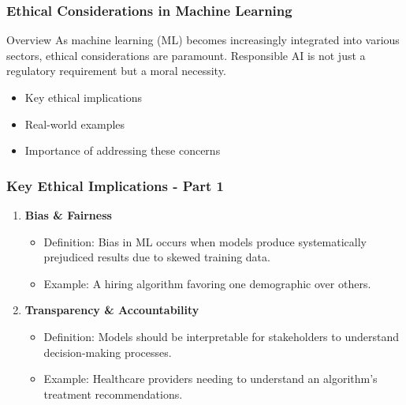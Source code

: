 \documentclass[aspectratio=169]{beamer}
\begin{document}
\begin{frame}[fragile]
    \frametitle{Ethical Considerations in Machine Learning}
    \begin{block}{Overview}
        As machine learning (ML) becomes increasingly integrated into various sectors, ethical considerations are paramount. Responsible AI is not just a regulatory requirement but a moral necessity.
    \end{block}
    \begin{itemize}
        \item Key ethical implications
        \item Real-world examples
        \item Importance of addressing these concerns
    \end{itemize}
\end{frame}

\begin{frame}[fragile]
    \frametitle{Key Ethical Implications - Part 1}
    \begin{enumerate}
        \item \textbf{Bias \& Fairness}
        \begin{itemize}
            \item Definition: Bias in ML occurs when models produce systematically prejudiced results due to skewed training data.
            \item Example: A hiring algorithm favoring one demographic over others.
        \end{itemize}

        \item \textbf{Transparency \& Accountability}
        \begin{itemize}
            \item Definition: Models should be interpretable for stakeholders to understand decision-making processes.
            \item Example: Healthcare providers needing to understand an algorithm's treatment recommendations.
        \end{itemize}
    \end{enumerate}
\end{frame}
\end{document}
